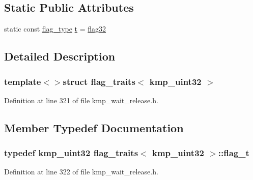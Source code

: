 \subsection*{Static Public Attributes}
\begin{DoxyCompactItemize}
\item 
static const \hyperlink{group__WAIT__RELEASE_ga507a7197646f995b5529a68c1481e39b}{flag\-\_\-type} \hyperlink{structflag__traits_3_01kmp__uint32_01_4_a28ceb6f9e5394c786d49d3849f29ba78}{t} = \hyperlink{group__WAIT__RELEASE_gga507a7197646f995b5529a68c1481e39baa8e37e16d043d78e34da1d19387be5ba}{flag32}
\end{DoxyCompactItemize}


\subsection{Detailed Description}
\subsubsection*{template$<$$>$struct flag\-\_\-traits$<$ kmp\-\_\-uint32 $>$}



Definition at line 321 of file kmp\-\_\-wait\-\_\-release.\-h.



\subsection{Member Typedef Documentation}
\hypertarget{structflag__traits_3_01kmp__uint32_01_4_a216e25725dfeeee57bb3367f0bffb763}{
\subsubsection[{flag\-\_\-t}]{\setlength{\rightskip}{0pt plus 5cm}typedef kmp\-\_\-uint32 {\bf flag\-\_\-traits}$<$ kmp\-\_\-uint32 $>$\-::{\bf flag\-\_\-t}}}\label{structflag__traits_3_01kmp__uint32_01_4_a216e25725dfeeee57bb3367f0bffb763}


Definition at line 322 of file kmp\-\_\-wait\-\_\-release.\-h.



